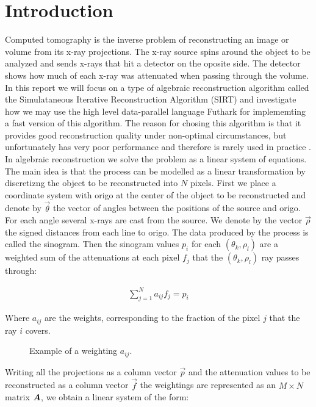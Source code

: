 \section{Introduction}
Computed tomography is the inverse problem of reconstructing an image or volume from its x-ray projections. The x-ray source spins around the object to be analyzed and sends x-rays that hit a detector on the oposite side. The detector shows how much of each x-ray was attenuated when passing through the volume. In this report we will focus on a type of algebraic reconstruction algorithm called the Simulataneous Iterative Reconstruction Algorithm (SIRT) and investigate how we may use the high level data-parallel language Futhark for implememting a fast version of this algorithm. The reason for chosing this algorithm is that it provides good reconstruction quality under non-optimal circumstances, but unfortunately has very poor performance and therefore is rarely used in practice .\\
In algebraic reconstruction we solve the problem as a linear system of equations. The main idea is that the process can be modelled as a linear transformation by discretizng the object to be reconstructed into $N$ pixels. First we place a coordinate system with origo at the center of the object to be reconstructed and denote by $\vec{\theta}$ the vector of angles between the positions of the source and origo. For each angle several x-rays are cast from the source. We denote by the vector $\vec{\rho}$ the signed distances from each line to origo. The data produced by the process is called the sinogram. Then the sinogram values $p_i$ for each $(\theta_k,\rho_l)$  are a weighted sum of the attenuations at each pixel $f_j$ that the $(\theta_k,\rho_l)$ ray passes through:

\begin{align}
\sum_{j=1}^N a_{ij}f_j=p_i
\end{align}

Where $a_{ij}$ are the weights, corresponding to the fraction of the pixel $j$ that the ray $i$ covers.

\begin{figure}
\centering
{}
\caption{Example of a weighting $a_{ij}$.}
\label{fig:weightings}
\end{figure}
Writing all the projections as a column vector $\vec{p}$ and the attenuation values to be reconstructed as a column vector $\vec{f}$ the weightings are represented as an $M\times N$ matrix $\mat{A}$, we obtain a linear system of the form:

